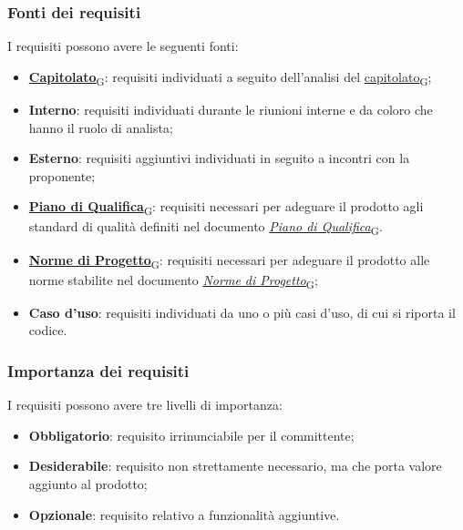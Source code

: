 \subsubsection{Fonti dei requisiti}
\label{sec:fonti_requisiti}
I requisiti possono avere le seguenti fonti:
\begin{itemize}
	\item \href{https://7last.github.io/docs/rtb/documentazione-interna/glossario#capitolato}{\textbf{Capitolato}\textsubscript{G}}: requisiti individuati a seguito dell'analisi del \href{https://7last.github.io/docs/rtb/documentazione-interna/glossario#capitolato}{capitolato\textsubscript{G}};
	\item \textbf{Interno}: requisiti individuati durante le riunioni interne e da coloro che hanno il ruolo di analista;
	\item \textbf{Esterno}: requisiti aggiuntivi individuati in seguito a incontri con la proponente;
	\item \href{https://7last.github.io/docs/rtb/documentazione-interna/glossario#piano-di-qualifica}{\textbf{Piano di Qualifica}\textsubscript{G}}: requisiti necessari per adeguare il prodotto agli standard di qualità definiti nel documento \href{https://7last.github.io/docs/rtb/documentazione-interna/glossario#piano-di-qualifica}{\textit{Piano di Qualifica}\textsubscript{G}}.
	\item \href{https://7last.github.io/docs/rtb/documentazione-interna/glossario#norme-di-progetto}{\textbf{Norme di Progetto}\textsubscript{G}}: requisiti necessari per adeguare il prodotto alle norme stabilite nel documento \href{https://7last.github.io/docs/rtb/documentazione-interna/glossario#norme-di-progetto}{\textit{Norme di Progetto}\textsubscript{G}};
	\item \textbf{Caso d'uso}: requisiti individuati da uno o più casi d'uso, di cui si riporta il codice.
\end{itemize}

\subsubsection{Importanza dei requisiti}
\label{sec:importanza_requisiti}
I requisiti possono avere tre livelli di importanza:
\begin{itemize}
	\item \textbf{Obbligatorio}: requisito irrinunciabile per il committente;
	\item \textbf{Desiderabile}: requisito non strettamente necessario, ma che porta valore aggiunto al prodotto;
	\item \textbf{Opzionale}: requisito relativo a funzionalità aggiuntive.
\end{itemize}


